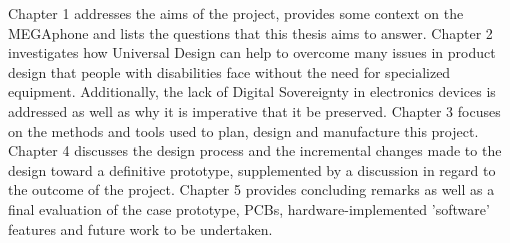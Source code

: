 Chapter 1 addresses the aims of the project, provides some context on the MEGAphone and lists the questions that this thesis aims to answer.
Chapter 2 investigates how Universal Design can help to overcome many issues in product design that people with disabilities face without the need for specialized equipment. 
Additionally, the lack of Digital Sovereignty in electronics devices is addressed as well as why it is imperative that it be preserved.
Chapter 3 focuses on the methods and tools used to plan, design and manufacture this project.
Chapter 4 discusses the design process and the incremental changes made to the design toward a definitive prototype, supplemented by a discussion in regard to the outcome of the project. 
Chapter 5 provides concluding remarks as well as a final evaluation of the case prototype, PCBs, hardware-implemented 'software' features and future work to be undertaken.



